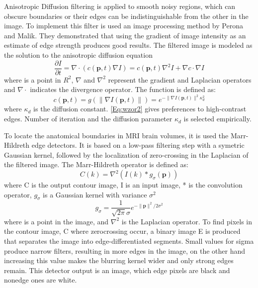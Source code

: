 Anisotropic Diffusion filtering is applied to smooth noisy regions, which can obscure boundaries or their edges can be indistinguishable from the other in the image. To implement this filter is used an image processing method by Perona and Malik. They demonstrated that using the gradient of image intensity as an estimate of edge strength produces good results. The filtered image is modeled as the solution to the anisotropic diffusion equation
\begin{equation}
    \frac{\partial I}{\partial t} = \nabla \cdot (c(\boldsymbol{p},t)\nabla I) = c(\boldsymbol{p},t)\nabla^{2}I + \nabla c \cdot \nabla I  \label{Eq:wzor1}
\end{equation}
where  is a point in $R^{2}$, $\nabla$ and $\nabla ^{2}$ represent the gradient and Laplacian operators and $\nabla\cdot$ indicates the divergence operator. The function is defined as:
\begin{equation}
    c(\boldsymbol{p},t) = g(\parallel\nabla I(\boldsymbol{p},t)\parallel) = e^{-\parallel\nabla I(\boldsymbol{p},t)\parallel^{2} \kappa^{2}_{d}} \label{Eq:wzor2}
\end{equation}
where $\kappa_{d}$ is the diffusion constant. \eqref{Eq:wzor2} gives preferences to high-contrast edges. Number of iteration and the diffusion parameter $\kappa_{d}$ is selected empirically.

To locate the anatomical boundaries in MRI brain volumes, it is used the Marr-Hildreth edge detectors. It is based on a low-pass filtering step with a symetric Gaussian kernel, followed by the localization of zero-crossing in the Laplacian of the filtered image. The Marr-Hildreth operator is defined as:
\begin{equation}
    C(k) = \nabla^{2}(I(k)*g_{\sigma}(\boldsymbol{p})) \label{Eq:wzor3}
\end{equation}
where C is the output contour image, I is an input image, * is the convolution operator, $g_{\sigma}$ is a Gaussian kernel with variance $\sigma^{2}$
\begin{equation}
    g_{\sigma} = \frac{1}{\sqrt{2\pi}\sigma}e^{- \parallel\boldsymbol{p}\parallel^{2}/2\sigma^{2}} \label{Eq:wzor4}
\end{equation}
where  is a point in the image, and $\nabla^{2}$ is the Laplacian operator.
To find pixels in the contour image, C where zerocrossing occur, a binary image E is produced that separates the image into edge-differentiated segments. Small values for sigma produce narrow filters, resulting in more edges in the image, on the other hand increasing this value makes the blurring kernel wider and only strong edges remain. This detector output is an image, which edge pixels are black and nonedge ones are white.

